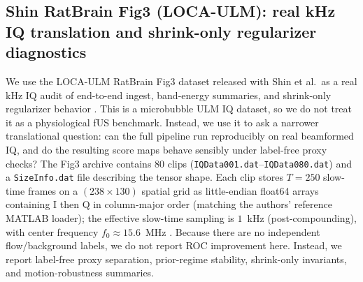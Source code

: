 \subsection{Shin RatBrain Fig3 (LOCA-ULM): real kHz IQ translation and shrink-only regularizer diagnostics}
\label{sec:shin-ratbrain}

We use the LOCA-ULM RatBrain Fig3 dataset released with Shin et al.\ as a real kHz IQ audit of end-to-end ingest, band-energy summaries, and shrink-only regularizer behavior \cite{ShinLOCAULM2024,ShinZenodo10711806}. This is a microbubble ULM IQ dataset, so we do not treat it as a physiological fUS benchmark. Instead, we use it to ask a narrower translational question: can the full pipeline run reproducibly on real beamformed IQ, and do the resulting score maps behave sensibly under label-free proxy checks? The Fig3 archive contains 80 clips (\texttt{IQData001.dat}--\texttt{IQData080.dat}) and a \texttt{SizeInfo.dat} file describing the tensor shape. Each clip stores $T=250$ slow-time frames on a $(238\times 130)$ spatial grid as little-endian float64 arrays containing I then Q in column-major order (matching the authors' reference MATLAB loader); the effective slow-time sampling is $1$~kHz (post-compounding), with center frequency $f_0\approx 15.6$~MHz \cite{ShinLOCAULM2024}. Because there are no independent flow/background labels, we do not report ROC improvement here. Instead, we report label-free proxy separation, prior-regime stability, shrink-only invariants, and motion-robustness summaries.

